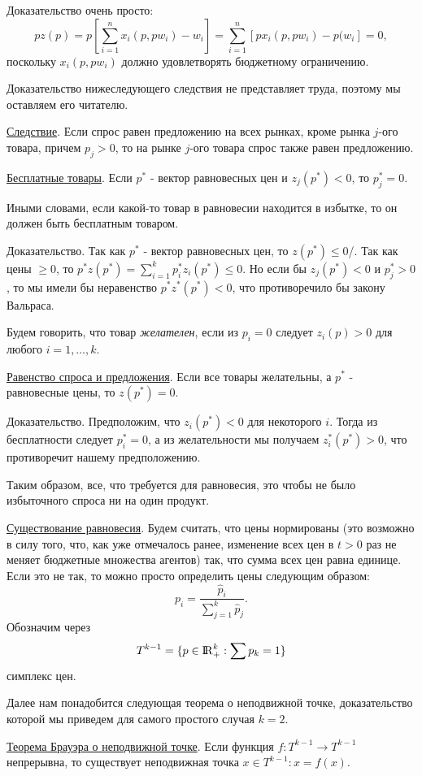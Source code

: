 Доказательство очень просто:
$$
pz(p)=p\left [\sum^n_{i=1}x_i(p,pw_i)-w_i\right ]=\sum^n_{i=1}[px_i(p,pw_i)-p(w_i]=0,
$$
поскольку $x_i(p,pw_i)$ должно удовлетворять бюджетному ограничению.

Доказательство нижеследующего следствия не представляет труда,
поэтому мы оставляем его читателю.

\underline{Следствие}. Если спрос равен предложению на всех
рынках, кроме рынка $j$-ого товара, причем $p_j>0$, то на
 рынке $j$-ого товара спрос также равен предложению.

\underline{Бесплатные товары}. Если $p^*$ - вектор равновесных цен и
$z_j(p^*)<0$, то $p^*_j=0$.

Иными словами, если какой-то товар в равновесии находится в избытке, то
он должен быть бесплатным товаром.

Доказательство. Так как $p^*$ - вектор равновесных цен, то
$z(p^*)\le 0$/. Так как цены $\ge 0$, то
$p^*z(p^*)=\sum^k_{i=1}p^*_iz_i(p^*)\le 0$. Но если бы $z_j(p^*)<0$ и
$p^*_j>0$, то мы имели бы неравенство $p^*z^*(p^*)<0$, что
противоречило бы закону Вальраса.

Будем говорить, что товар \emph{желателен}, если из $p_i=0$ следует
$z_i(p)>0$ для любого $i=1,\ldots,k$.

\underline{Равенство спроса и предложения}. Если все товары желательны, а $p^*$ -
равновесные цены, то $z(p^*)=0$.

Доказательство. Предположим, что $z_i(p^*)<0$ для некоторого $i$. Тогда
из бесплатности следует $p^*_i=0$, а из
желательности мы получаем $z_i^*(p^*)>0$, что противоречит нашему предположению.

Таким образом, все, что требуется для равновесия, это
чтобы не было избыточного спроса ни на один продукт.

\underline{Существование равновесия}. Будем считать, что цены
нормированы (это возможно в силу того, что, как уже отмечалось ранее,
изменение всех цен
в $t>0$ раз не меняет бюджетные множества агентов) так, что
сумма всех цен равна единице. Если это не так, то можно просто
определить цены следующим образом:
$$
p_i={\frac{\hat p_i}{\sum^k_{j=1}\hat p_j}}.
$$
Обозначим через
$$T^{k-1}=\{p\in{\rm I\!R}^k_+:\sum p_k=1\}$$
симплекс цен.

Далее нам понадобится следующая теорема о неподвижной точке,
доказательство которой мы приведем для самого простого случая $k=2$.

\underline{Теорема Брауэра о неподвижной точке}. Если функция $f:T^{k-1}\to
T^{k-1}$ непрерывна, то существует неподвижная точка $x\in T^{k-1}: x=f(x)$.

